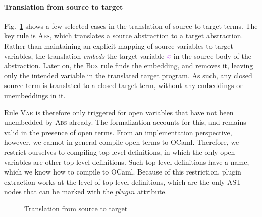 \iffull

\paragraph{\bf Translation from source to target}
Fig.~\ref{fig:translation} shows a few
selected cases in the translation of source to target terms.
The key rule is \textsc{Abs}, which translates a source
abstraction to a target abstraction. Rather than maintaining an explicit mapping of
source variables to target variables, the translation \emph{embeds} the target
variable $\tvar x$
in the source body of the abstraction. Later on, the \textsc{Box} rule finds the
embedding, and removes it, leaving only the intended variable in the translated
target program. As such, any closed source term is translated to a closed target
term, without any embeddings or unembeddings in it.

Rule \textsc{Var} is therefore only triggered for open variables that have not
been unembedded by \textsc{Abs} already. The formalization accounts
for this, and remains valid in the presence of open
terms. From an implementation perspective, however, we cannot in general compile
open terms to OCaml. Therefore, we restrict ourselves to compiling top-level
definitions, in which the only open variables are other top-level definitions.
Such top-level definitions have a name, which we know how to compile to OCaml.
Because of this restriction, plugin extraction works at the level of top-level
definitions, which are the only AST nodes that can be marked with the
\ls$plugin$ attribute.

\begin{figure}[h]
  \centering
{}
           \caption{Translation from source to target}
           \label{fig:translation}
\end{figure}
\fi

